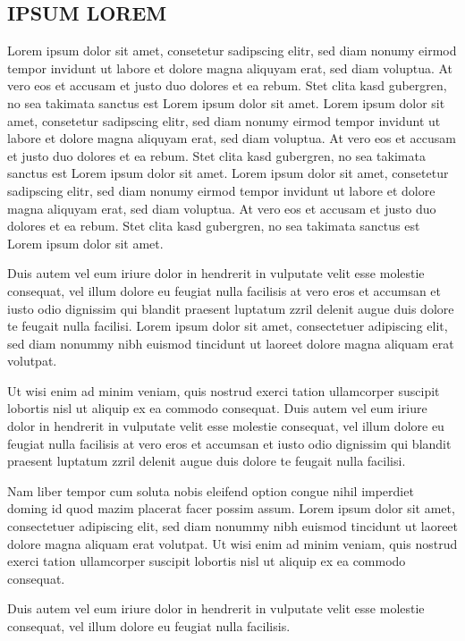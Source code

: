 \documentclass[]{../metanetpaper}
\begin{document}
\subsection{IPSUM LOREM}
Lorem ipsum dolor sit amet, consetetur sadipscing elitr, sed diam nonumy eirmod tempor invidunt ut labore et dolore magna aliquyam erat, sed diam voluptua. At vero eos et accusam et justo duo dolores et ea rebum. Stet clita kasd gubergren, no sea takimata sanctus est Lorem ipsum dolor sit amet. Lorem ipsum dolor sit amet, consetetur sadipscing elitr, sed diam nonumy eirmod tempor invidunt ut labore et dolore magna aliquyam erat, sed diam voluptua. At vero eos et accusam et justo duo dolores et ea rebum. Stet clita kasd gubergren, no sea takimata sanctus est Lorem ipsum dolor sit amet. Lorem ipsum dolor sit amet, consetetur sadipscing elitr, sed diam nonumy eirmod tempor invidunt ut labore et dolore magna aliquyam erat, sed diam voluptua. At vero eos et accusam et justo duo dolores et ea rebum. Stet clita kasd gubergren, no sea takimata sanctus est Lorem ipsum dolor sit amet.   

Duis autem vel eum iriure dolor in hendrerit in vulputate velit esse molestie consequat, vel illum dolore eu feugiat nulla facilisis at vero eros et accumsan et iusto odio dignissim qui blandit praesent luptatum zzril delenit augue duis dolore te feugait nulla facilisi. Lorem ipsum dolor sit amet, consectetuer adipiscing elit, sed diam nonummy nibh euismod tincidunt ut laoreet dolore magna aliquam erat volutpat.   

Ut wisi enim ad minim veniam, quis nostrud exerci tation ullamcorper suscipit lobortis nisl ut aliquip ex ea commodo consequat. Duis autem vel eum iriure dolor in hendrerit in vulputate velit esse molestie consequat, vel illum dolore eu feugiat nulla facilisis at vero eros et accumsan et iusto odio dignissim qui blandit praesent luptatum zzril delenit augue duis dolore te feugait nulla facilisi.   

Nam liber tempor cum soluta nobis eleifend option congue nihil imperdiet doming id quod mazim placerat facer possim assum. Lorem ipsum dolor sit amet, consectetuer adipiscing elit, sed diam nonummy nibh euismod tincidunt ut laoreet dolore magna aliquam erat volutpat. Ut wisi enim ad minim veniam, quis nostrud exerci tation ullamcorper suscipit lobortis nisl ut aliquip ex ea commodo consequat.   

Duis autem vel eum iriure dolor in hendrerit in vulputate velit esse molestie consequat, vel illum dolore eu feugiat nulla facilisis.   
\end{document}
